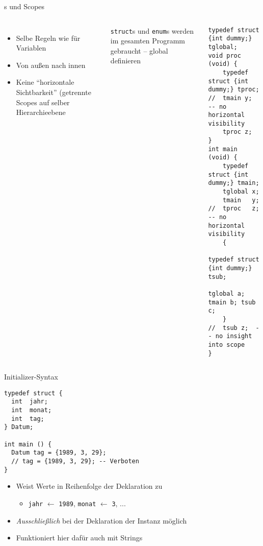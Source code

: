 \begin{frame}[t,fragile]{s und Scopes}
%
\vspace{-10pt}
\begin{columns}[T]
%
\begin{itemize}
\item Selbe Regeln wie für Variablen
\item Von außen nach innen
\item Keine \enquote{horizontale Sichtbarkeit} (getrennte Scopes auf selber Hierarchieebene
\end{itemize}
%
\begin{hintbox}
\texttt{struct}s und \texttt{enum}s werden \idR im gesamten Programm gebraucht -- global definieren
\end{hintbox}
%
\vspace{-10pt}
\begin{codebox}
\begin{verbatim}
typedef struct {int dummy;} tglobal;
void proc (void) {
    typedef struct {int dummy;} tproc;
//  tmain y;  -- no horizontal visibility
    tproc z;
}
int main (void) {
    typedef struct {int dummy;} tmain;
    tglobal x;
    tmain   y;
//  tproc   z; -- no horizontal visibility
    {
        typedef struct {int dummy;} tsub;
        tglobal a; tmain b; tsub c;
    }
//  tsub z;  -- no insight into scope
}
\end{verbatim}
\end{codebox}
\end{columns}

%
\end{frame}


\begin{frame}[fragile]{Initializer-Syntax}
%
\vspace{-10pt}
\begin{codebox}
\begin{verbatim}
typedef struct {
  int  jahr;
  int  monat;
  int  tag;
} Datum;

int main () {
  Datum tag = {1989, 3, 29};
  // tag = {1989, 3, 29}; -- Verboten
}
\end{verbatim}
\end{codebox}
%
\begin{itemize}
\item Weist Werte in Reihenfolge der Deklaration zu
	\begin{itemize}
	\item \texttt{jahr} $\leftarrow$ \texttt{1989}, \texttt{monat} $\leftarrow$ \texttt{3}, ...
	\end{itemize}
\item \emph{Ausschließlich} bei der Deklaration der Instanz möglich
\item Funktioniert hier dafür auch mit Strings
\end{itemize}
%
\end{frame}

